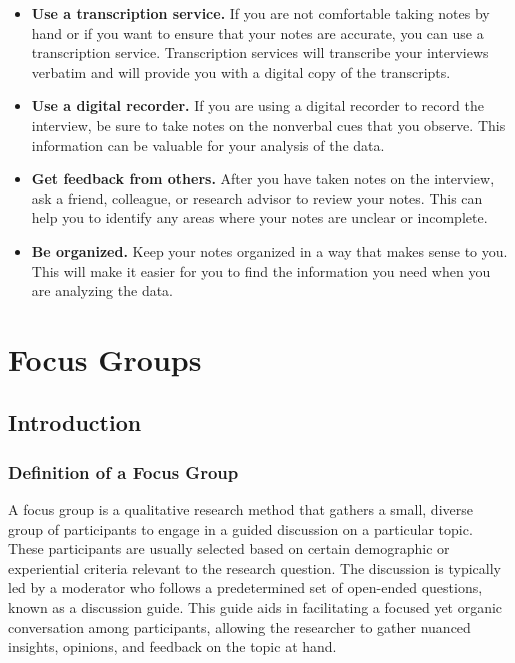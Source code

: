 \documentclass[
  b5paper]{book}
\begin{document}
\begin{itemize}
\item
  \textbf{Use a transcription service.} If you are not comfortable taking notes by hand or if you want to ensure that your notes are accurate, you can use a transcription service. Transcription services will transcribe your interviews verbatim and will provide you with a digital copy of the transcripts.
\item
  \textbf{Use a digital recorder.} If you are using a digital recorder to record the interview, be sure to take notes on the nonverbal cues that you observe. This information can be valuable for your analysis of the data.
\item
  \textbf{Get feedback from others.} After you have taken notes on the interview, ask a friend, colleague, or research advisor to review your notes. This can help you to identify any areas where your notes are unclear or incomplete.
\item
  \textbf{Be organized.} Keep your notes organized in a way that makes sense to you. This will make it easier for you to find the information you need when you are analyzing the data.
\end{itemize}

\hypertarget{focus-groups-1}{%
\chapter{Focus Groups}\label{focus-groups-1}}

\hypertarget{introduction-1}{%
\section{Introduction}\label{introduction-1}}

\hypertarget{definition-of-a-focus-group}{%
\subsection*{Definition of a Focus Group}\label{definition-of-a-focus-group}}

A focus group is a qualitative research method that gathers a small, diverse group of participants to engage in a guided discussion on a particular topic. These participants are usually selected based on certain demographic or experiential criteria relevant to the research question. The discussion is typically led by a moderator who follows a predetermined set of open-ended questions, known as a discussion guide. This guide aids in facilitating a focused yet organic conversation among participants, allowing the researcher to gather nuanced insights, opinions, and feedback on the topic at hand.
\end{document}

